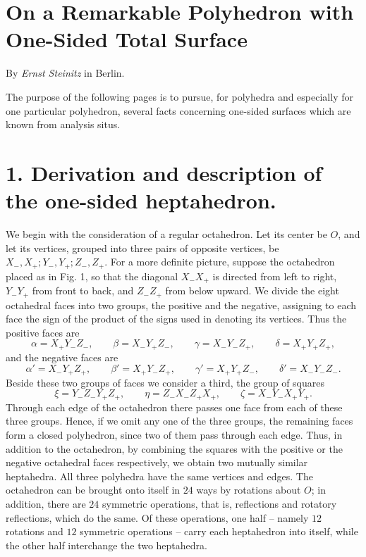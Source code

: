 \documentclass[11pt,a4paper]{article}
\begin{document}
\section*{On a Remarkable Polyhedron with One-Sided Total Surface}
\begin{center}
By \emph{Ernst Steinitz} in Berlin.
\end{center}

The purpose of the following pages is to pursue, for polyhedra and especially for one particular polyhedron, several facts concerning one-sided surfaces which are known from analysis situs.

\section*{1. Derivation and description of the one-sided heptahedron.}

We begin with the consideration of a regular octahedron. Let its center be $O$, and let its vertices, grouped into three pairs of opposite vertices, be $X_-,X_+;Y_-,Y_+;Z_-,Z_+$. For a more definite picture, suppose the octahedron placed as in Fig. 1, so that the diagonal $X_-X_+$ is directed from left to right, $Y_-Y_+$ from front to back, and $Z_-Z_+$ from below upward. We divide the eight octahedral faces into two groups, the positive and the negative, assigning to each face the sign of the product of the signs used in denoting its vertices. Thus the positive faces are
\[
 \alpha=X_+Y_-Z_-,\qquad \beta=X_-Y_+Z_-,\qquad \gamma=X_-Y_-Z_+,\qquad \delta=X_+Y_+Z_+,
\]
and the negative faces are
\[
 \alpha'=X_-Y_+Z_+,\qquad \beta'=X_+Y_-Z_+,\qquad \gamma'=X_+Y_+Z_-,\qquad \delta'=X_-Y_-Z_-.
\]
Beside these two groups of faces we consider a third, the group of squares
\[
 \xi=Y_-Z_-Y_+Z_+,
 \qquad \eta=Z_-X_-Z_+X_+,
 \qquad \zeta=X_-Y_-X_+Y_+.
\]
Through each edge of the octahedron there passes one face from each of these three groups. Hence, if we omit any one of the three groups, the remaining faces form a closed polyhedron, since two of them pass through each edge. Thus, in addition to the octahedron, by combining the squares with the positive or the negative octahedral faces respectively, we obtain two mutually similar heptahedra. All three polyhedra have the same vertices and edges. The octahedron can be brought onto itself in $24$ ways by rotations about $O$; in addition, there are $24$ symmetric operations, that is, reflections and rotatory reflections, which do the same. Of these operations, one half -- namely $12$ rotations and $12$ symmetric operations -- carry each heptahedron into itself, while the other half interchange the two heptahedra.
\end{document}
